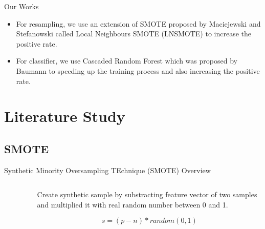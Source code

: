 \documentclass{beamer}
\begin{document}
\begin{frame}{Our Works}
	\begin{itemize}
		\item For resampling, we use an extension of SMOTE proposed by
		Maciejewski and Stefanowski called Local Neighbours SMOTE (LNSMOTE)
		to increase the positive rate.
		\item For classifier, we use Cascaded Random Forest which was
		proposed by Baumann to speeding up the training process and also
		increasing the positive rate.
	\end{itemize}
\end{frame}

\section{Literature Study}

\begin{frame}
	\begin{multicols}{2}
		\tableofcontents[currentsection]
	\end{multicols}
\end{frame}

\subsection{SMOTE}

\begin{frame}{Synthetic Minority Oversampling TEchnique (SMOTE)}
	{Overview}
	\begin{columns}
		\begin{column}{0.5\textwidth}
			\begin{figure}
				\centering
			\end{figure}
		\end{column}

		\begin{column}{0.5\textwidth}
			Create synthetic sample by substracting feature vector of two
			samples and multiplied it with real random number between 0 and
			1.

			\[
				s = (p - n) * random(0,1)
			\]
		\end{column}
	\end{columns}
\end{frame}
\end{document}
